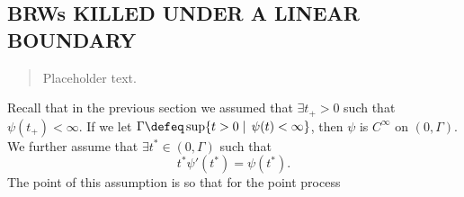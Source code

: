 \subsection{BRWs KILLED UNDER A LINEAR BOUNDARY}

\begin{quote}
{\small Placeholder text. }
\end{quote}

Recall that in the previous section we assumed that $\exists t_+ > 0$ such that $\psi(t_+) < \infty$. If we let $\Gamma \defeq \sup\{ t > 0 \mid\, \psi(t) < \infty \}$, then $\psi$ is $C^\infty$ on $(0, \Gamma)$. We further assume that $\exists t^* \in (0, \Gamma)$ such that 
\begin{equation}\label{ass:TStar}
t^* \psi'(t^*) = \psi(t^*). 
\end{equation}
The point of this assumption is so that for the point process 